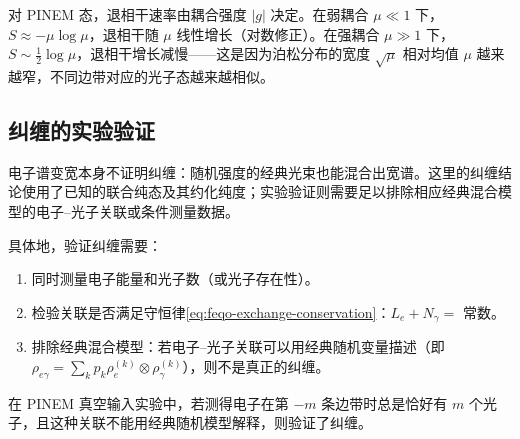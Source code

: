 对 PINEM 态，退相干速率由耦合强度 \(|g|\) 决定。在弱耦合 \(\mu\ll1\) 下，\(S\approx-\mu\log\mu\)，退相干随 \(\mu\) 线性增长（对数修正）。在强耦合 \(\mu\gg1\) 下，\(S\sim\frac{1}{2}\log\mu\)，退相干增长减慢——这是因为泊松分布的宽度 \(\sqrt{\mu}\) 相对均值 \(\mu\) 越来越窄，不同边带对应的光子态越来越相似。

\subsection{纠缠的实验验证}

电子谱变宽本身不证明纠缠：随机强度的经典光束也能混合出宽谱。这里的纠缠结论使用了已知的联合纯态及其约化纯度；实验验证则需要足以排除相应经典混合模型的电子--光子关联或条件测量数据。

具体地，验证纠缠需要：
\begin{enumerate}
\item 同时测量电子能量和光子数（或光子存在性）。
\item 检验关联是否满足守恒律\cref{eq:feqo-exchange-conservation}：\(L_e+N_\gamma=\) 常数。
\item 排除经典混合模型：若电子--光子关联可以用经典随机变量描述（即 \(\rho_{e\gamma}=\sum_k p_k\rho_e^{(k)}\otimes\rho_\gamma^{(k)}\)），则不是真正的纠缠。
\end{enumerate}
在 PINEM 真空输入实验中，若测得电子在第 \(-m\) 条边带时总是恰好有 \(m\) 个光子，且这种关联不能用经典随机模型解释，则验证了纠缠。





